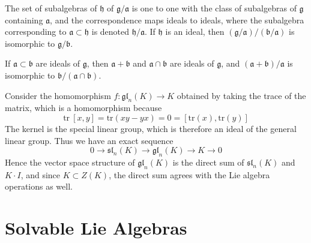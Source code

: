 \begin{theorem}
    The set of subalgebras of $\mathfrak{h}$ of $\mathfrak{g}/\mathfrak{a}$ is one to one with the class of subalgebras of $\mathfrak{g}$ containing $\mathfrak{a}$, and the correspondence maps ideals to ideals, where the subalgebra corresponding to $\mathfrak{a} \subset \mathfrak{h}$ is denoted $\mathfrak{h}/\mathfrak{a}$. If $\mathfrak{h}$ is an ideal, then $(\mathfrak{g}/\mathfrak{a})/(\mathfrak{b}/\mathfrak{a})$ is isomorphic to $\mathfrak{g}/\mathfrak{b}$.
\end{theorem}

\begin{theorem}
    If $\mathfrak{a} \subset \mathfrak{b}$ are ideals of $\mathfrak{g}$, then $\mathfrak{a} + \mathfrak{b}$ and $\mathfrak{a} \cap \mathfrak{b}$ are ideals of $\mathfrak{g}$, and $(\mathfrak{a} + \mathfrak{b})/\mathfrak{a}$ is isomorphic to $\mathfrak{b}/(\mathfrak{a} \cap \mathfrak{b})$.
\end{theorem}

\begin{example}
    Consider the homomorphism $f: \mathfrak{gl}_n(K) \to K$ obtained by taking the trace of the matrix, which is a homomorphism because
    \[ \text{tr}\ [x,y] = \text{tr}(xy - yx) = 0 = [\text{tr}(x), \text{tr}(y)] \]
    The kernel is the special linear group, which is therefore an ideal of the general linear group. Thus we have an exact sequence
    \[ 0 \to \mathfrak{sl}_n(K) \to \mathfrak{gl}_n(K) \to K \to 0 \]
    Hence the vector space structure of $\mathfrak{gl}_n(K)$ is the direct sum of $\mathfrak{sl}_n(K)$ and $K \cdot I$, and since $K \subset Z(K)$, the direct sum agrees with the Lie algebra operations as well.
\end{example}





\section{Solvable Lie Algebras}

